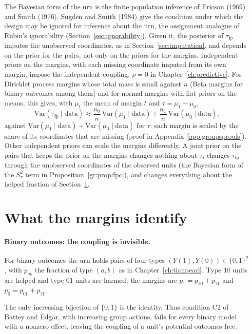 The Bayesian form of the urn is the finite population inference of Ericson (1969) and Smith (1976). Sugden and Smith (1984) give the condition under which the design may be ignored for inference about the urn, the assignment analogue of Rubin's ignorability (Section~\ref{sec:ignorability}). Given it, the posterior of $\tau_{\mathrm{fp}}$ imputes the unobserved coordinates, as in Section~\ref{sec:imputation}, and depends on the prior for the pairs, not only on the priors for the margins. Independent priors on the margins, with each missing coordinate imputed from its own margin, impose the independent coupling, $\rho=0$ in Chapter~\ref{ch:predictive}. For Dirichlet process margins whose total mass is small against $n$ (Beta margins for binary outcomes among them) and for normal margins with flat priors on the means, this gives, with $\mu_t$ the mean of margin $t$ and $\tau=\mu_1-\mu_0$,
\[
\mathrm{Var}(\tau_{\mathrm{fp}}\mid\text{data})\approx\frac{n_0}{n}\,\mathrm{Var}(\mu_1\mid\text{data})+\frac{n_1}{n}\,\mathrm{Var}(\mu_0\mid\text{data}),
\]
against $\mathrm{Var}(\mu_1\mid\text{data})+\mathrm{Var}(\mu_0\mid\text{data})$ for $\tau$: each margin is scaled by the share of its coordinates that are missing (proof in Appendix~\ref{app:groupsproofs}). Other independent priors can scale the margins differently. A joint prior on the pairs that keeps the prior on the margins changes nothing about $\tau$, changes $\tau_{\mathrm{fp}}$ through the unobserved coordinates of the observed units (the Bayesian form of the $S_\tau^2$ term in Proposition~\ref{gr:prop:fpc}), and changes everything about the helped fraction of Section~\ref{gr:sec:margins}.

\section{What the margins identify}\label{gr:sec:margins}

\paragraph{Binary outcomes: the coupling is invisible.} For binary outcomes the urn holds pairs of four types $(Y(1),Y(0))\in\{0,1\}^2$, with $p_{ab}$ the fraction of type $(a,b)$ as in Chapter~\ref{ch:tianpearl}. Type $10$ units are helped and type $01$ units are harmed; the margins are $p_1=p_{10}+p_{11}$ and $p_0=p_{01}+p_{11}$.

\begin{lemma}\label{gr:lem:binary}
The only increasing bijection of $\{0,1\}$ is the identity. Thus condition C2 of Battey and Edgar, with increasing group actions, fails for every binary model with a nonzero effect, leaving the coupling of a unit's potential outcomes free.
\end{lemma}

